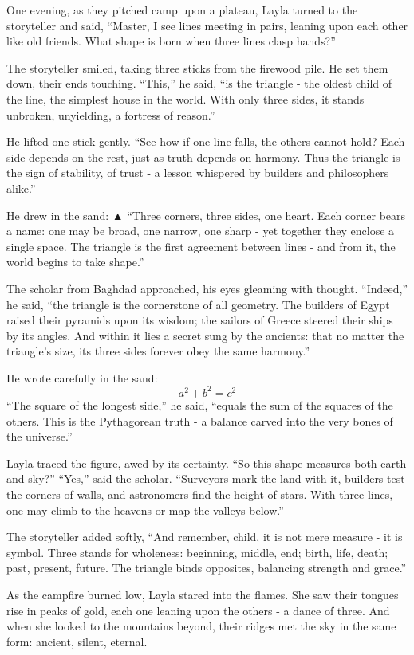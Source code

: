 \documentclass[
  letterpaper,
  DIV=11,
  numbers=noendperiod]{scrreprt}
\begin{document}
One evening, as they pitched camp upon a plateau, Layla turned to the
storyteller and said, ``Master, I see lines meeting in pairs, leaning
upon each other like old friends. What shape is born when three lines
clasp hands?''

The storyteller smiled, taking three sticks from the firewood pile. He
set them down, their ends touching. ``This,'' he said, ``is the triangle
- the oldest child of the line, the simplest house in the world. With
only three sides, it stands unbroken, unyielding, a fortress of
reason.''

He lifted one stick gently. ``See how if one line falls, the others
cannot hold? Each side depends on the rest, just as truth depends on
harmony. Thus the triangle is the sign of stability, of trust - a lesson
whispered by builders and philosophers alike.''

He drew in the sand: ▲ ``Three corners, three sides, one heart. Each
corner bears a name: one may be broad, one narrow, one sharp - yet
together they enclose a single space. The triangle is the first
agreement between lines - and from it, the world begins to take shape.''

The scholar from Baghdad approached, his eyes gleaming with thought.
``Indeed,'' he said, ``the triangle is the cornerstone of all geometry.
The builders of Egypt raised their pyramids upon its wisdom; the sailors
of Greece steered their ships by its angles. And within it lies a secret
sung by the ancients: that no matter the triangle's size, its three
sides forever obey the same harmony.''

He wrote carefully in the sand: \[
a^2 + b^2 = c^2
\] ``The square of the longest side,'' he said, ``equals the sum of the
squares of the others. This is the Pythagorean truth - a balance carved
into the very bones of the universe.''

Layla traced the figure, awed by its certainty. ``So this shape measures
both earth and sky?'' ``Yes,'' said the scholar. ``Surveyors mark the
land with it, builders test the corners of walls, and astronomers find
the height of stars. With three lines, one may climb to the heavens or
map the valleys below.''

The storyteller added softly, ``And remember, child, it is not mere
measure - it is symbol. Three stands for wholeness: beginning, middle,
end; birth, life, death; past, present, future. The triangle binds
opposites, balancing strength and grace.''

As the campfire burned low, Layla stared into the flames. She saw their
tongues rise in peaks of gold, each one leaning upon the others - a
dance of three. And when she looked to the mountains beyond, their
ridges met the sky in the same form: ancient, silent, eternal.
\end{document}
